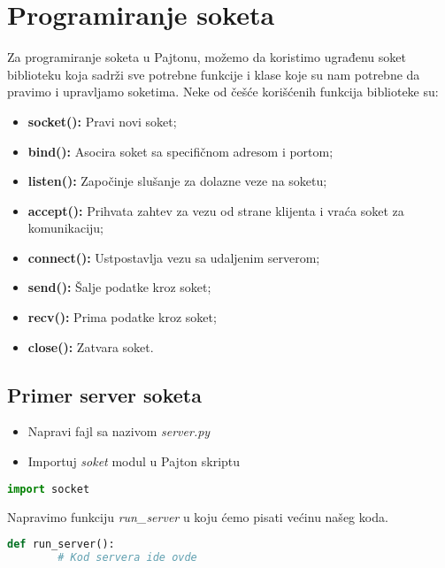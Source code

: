 \section{Programiranje soketa}

Za programiranje soketa u Pajtonu, možemo da koristimo ugrađenu soket biblioteku koja sadrži sve potrebne funkcije i klase koje su nam potrebne da pravimo i upravljamo soketima. Neke od češće korišćenih funkcija biblioteke su:
\begin{itemize}
    \item \textbf{socket():} Pravi novi soket;
    \item \textbf{bind():} Asocira soket sa specifičnom adresom i portom;
    \item \textbf{listen():} Započinje slušanje za dolazne veze na soketu;
    \item \textbf{accept():} Prihvata zahtev za vezu od strane klijenta i vraća soket za komunikaciju;
    \item \textbf{connect():} Ustpostavlja vezu sa udaljenim serverom;
    \item \textbf{send():} Šalje podatke kroz soket;
    \item \textbf{recv():} Prima podatke kroz soket;
    \item \textbf{close():} Zatvara soket.
\end{itemize}

\subsection{Primer server soketa}

\begin{itemize}
    \item Napravi fajl sa nazivom \emph{server.py}
    \item Importuj \emph{soket} modul u Pajton skriptu
\end{itemize}

\vspace{0.5cm}

\begin{lstlisting}[language = Python]
    import socket
\end{lstlisting}


Napravimo funkciju \emph{run\_server} u koju ćemo pisati većinu našeg koda.

\vspace{0.5cm}

\begin{lstlisting}[language = Python]
    def run_server():
        # Kod servera ide ovde
\end{lstlisting}

